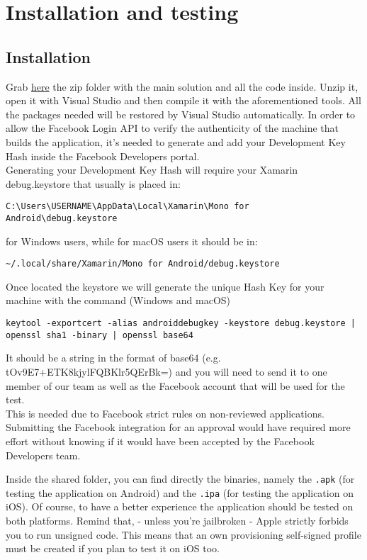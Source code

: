 \chapter{Installation and testing}
\label{cha:testing}

\section{Installation}
Grab \href{https://polimi365-my.sharepoint.com/personal/10638011_polimi_it/_layouts/15/guestaccess.aspx?folderid=17ec0864eda3e43c598adb485f2936b1d&authkey=Ac4WJRl5aR5sFRnQ0vSCsnM&e=ah8cXJ}{here} the zip folder with the main solution and all the code inside. Unzip it, open it with Visual Studio and then compile it with the aforementioned tools. All the packages needed will be restored by Visual Studio automatically. 
In order to allow the Facebook Login API to verify the authenticity of the machine that builds the application, it's needed to generate and add your Development Key Hash inside the Facebook Developers portal.\\
Generating your Development Key Hash will require your Xamarin debug.keystore that usually is placed in: \begin{verbatim}C:\Users\USERNAME\AppData\Local\Xamarin\Mono for Android\debug.keystore \end{verbatim}
for Windows users, while for macOS users it should be in: \begin{verbatim}~/.local/share/Xamarin/Mono for Android/debug.keystore\end{verbatim}
Once located the keystore we will generate the unique Hash Key for your machine with the command (Windows and macOS)
\begin{verbatim}
keytool -exportcert -alias androiddebugkey -keystore debug.keystore | 
openssl sha1 -binary | openssl base64 
 \end{verbatim}
It should be a string in the format of base64 (e.g. tOv9E7+ETK8kjylFQBKlr5QErBk=) and you will need to send it to one member of our team as well as the Facebook account that will be used for the test. \\

This is needed due to Facebook strict rules on non-reviewed applications. Submitting the Facebook integration for an approval would have required more effort without knowing if it would have been accepted by the Facebook Developers team.

Inside the shared folder, you can find directly the binaries, namely the \verb|.apk| (for testing the application on Android) and the \verb|.ipa| (for testing the application on iOS). Of course, to have a better experience the application should be tested on both platforms. Remind that, - unless you're jailbroken - Apple strictly forbids you to run unsigned code. This means that an own provisioning self-signed profile must be created if you plan to test it on iOS too.

